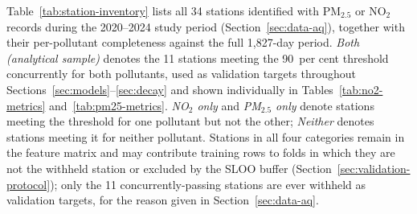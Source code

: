 \documentclass[11pt,a4paper]{article}
\begin{document}
Table~\ref{tab:station-inventory} lists all 34 stations identified with PM$_{2.5}$ or NO$_2$ records during the 2020--2024 study period (Section~\ref{sec:data-aq}), together with their per-pollutant completeness against the full 1{,}827-day period. \textit{Both (analytical sample)} denotes the 11 stations meeting the 90~per cent threshold concurrently for both pollutants, used as validation targets throughout Sections~\ref{sec:models}--\ref{sec:decay} and shown individually in Tables~\ref{tab:no2-metrics} and~\ref{tab:pm25-metrics}. \textit{NO$_2$ only} and \textit{PM$_{2.5}$ only} denote stations meeting the threshold for one pollutant but not the other; \textit{Neither} denotes stations meeting it for neither pollutant. Stations in all four categories remain in the feature matrix and may contribute training rows to folds in which they are not the withheld station or excluded by the SLOO buffer (Section~\ref{sec:validation-protocol}); only the 11 concurrently-passing stations are ever withheld as validation targets, for the reason given in Section~\ref{sec:data-aq}.
\end{document}
